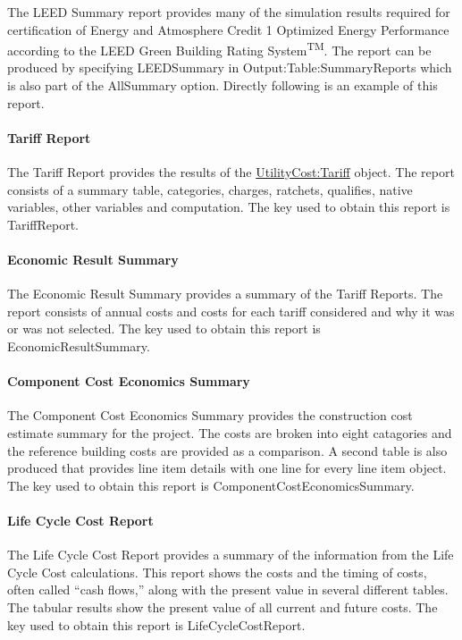 The LEED Summary report provides many of the simulation results required for certification of Energy and Atmosphere Credit 1 Optimized Energy Performance according to the LEED Green Building Rating System\textsuperscript{TM}. The report can be produced by specifying LEEDSummary in Output:Table:SummaryReports which is also part of the AllSummary option. Directly following is an example of this report.

\paragraph{Tariff Report}\label{TariffReport}

The Tariff Report provides the results of the \hyperref[utilitycosttariff]{UtilityCost:Tariff} object. The report consists of a summary table, categories, charges, ratchets, qualifies, native variables, other variables and computation. The key used to obtain this report is TariffReport.

\paragraph{Economic Result Summary}\label{EconomicResultSummary}

The Economic Result Summary provides a summary of the Tariff Reports. The report consists of annual costs and costs for each tariff considered and why it was or was not selected. The key used to obtain this report is EconomicResultSummary.

\paragraph{Component Cost Economics Summary}\label{component-cost-economics-summary}

The Component Cost Economics Summary provides the construction cost estimate summary for the project. The costs are broken into eight catagories and the reference building costs are provided as a comparison. A second table is also produced that provides line item details with one line for every line item object. The key used to obtain this report is ComponentCostEconomicsSummary.

\paragraph{Life Cycle Cost Report}\label{LifeCycleCostReport}

The Life Cycle Cost Report provides a summary of the information from the Life Cycle Cost calculations.  This report shows the costs and the timing of costs, often called “cash flows,” along with the present value in several different tables. The tabular results show the present value of all current and future costs. The key used to obtain this report is LifeCycleCostReport.

